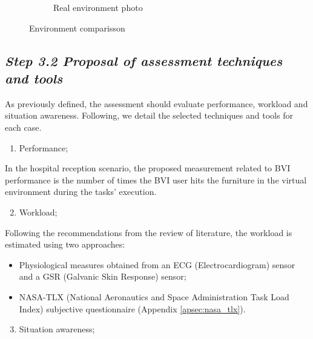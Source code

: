 \begin{figure}[!htb]
\begin{subfigure}[b]{0.49\textwidth}
                \caption{Real environment photo}
                \label{fig:re_photo}
            \end{subfigure}
               \caption{Environment comparisson}
               \label{fig:ve_re}
        \end{figure}

    \subsection*{\textit{Step 3.2 Proposal of assessment techniques and tools}}

        As previously defined, the assessment should evaluate performance, workload and situation awareness. Following, we detail the selected techniques and tools for each case.

        \begin{enumerate} [label = \Alph*)]
            \item Performance;
        \end{enumerate}
            
        In the hospital reception scenario, the proposed measurement related to BVI performance is the number of times the BVI user hits the furniture in the virtual environment during the tasks' execution.

        \begin{enumerate} [label = \Alph*)]
            \setcounter{enumi}{1}
            \item Workload;
        \end{enumerate}

        Following the recommendations from the review of literature, the workload is estimated using two approaches:
        \begin{itemize}
            \item Physiological measures obtained from an ECG (Electrocardiogram) sensor and a GSR (Galvanic Skin Response) sensor;
            \item NASA-TLX (National Aeronautics and Space Administration Task Load Index) subjective questionnaire (Appendix \ref{apsec:nasa_tlx}).           
        \end{itemize}

        \begin{enumerate} [label = \Alph*)]
            \setcounter{enumi}{2}
            \item Situation awareness;
        \end{enumerate}


